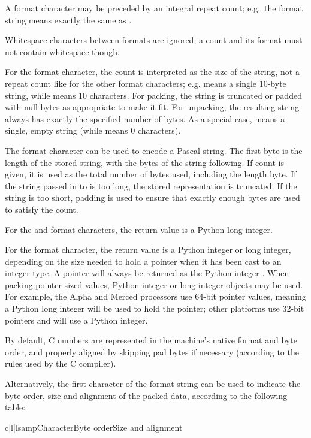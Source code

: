 A format character may be preceded by an integral repeat count;
e.g.\ the format string  means exactly the same as
.

Whitespace characters between formats are ignored; a count and its
format must not contain whitespace though.

For the  format character, the count is interpreted as the
size of the string, not a repeat count like for the other format
characters; e.g.  means a single 10-byte string, while
 means 10 characters.  For packing, the string is
truncated or padded with null bytes as appropriate to make it fit.
For unpacking, the resulting string always has exactly the specified
number of bytes.  As a special case,  means a single, empty
string (while  means 0 characters).

The  format character can be used to encode a Pascal
string.  The first byte is the length of the stored string, with the
bytes of the string following.  If count is given, it is used as the
total number of bytes used, including the length byte.  If the string
passed in to  is too long, the stored representation
is truncated.  If the string is too short, padding is used to ensure
that exactly enough bytes are used to satisfy the count.

For the  and  format characters, the return
value is a Python long integer.

For the  format character, the return value is a Python
integer or long integer, depending on the size needed to hold a
pointer when it has been cast to an integer type.  A \NULL{} pointer will
always be returned as the Python integer . When packing pointer-sized
values, Python integer or long integer objects may be used.  For
example, the Alpha and Merced processors use 64-bit pointer values,
meaning a Python long integer will be used to hold the pointer; other
platforms use 32-bit pointers and will use a Python integer.

By default, C numbers are represented in the machine's native format
and byte order, and properly aligned by skipping pad bytes if
necessary (according to the rules used by the C compiler).

Alternatively, the first character of the format string can be used to
indicate the byte order, size and alignment of the packed data,
according to the following table:

\begin{tableiii}{c|l|l}{samp}{Character}{Byte order}{Size and alignment}
\end{tableiii}


